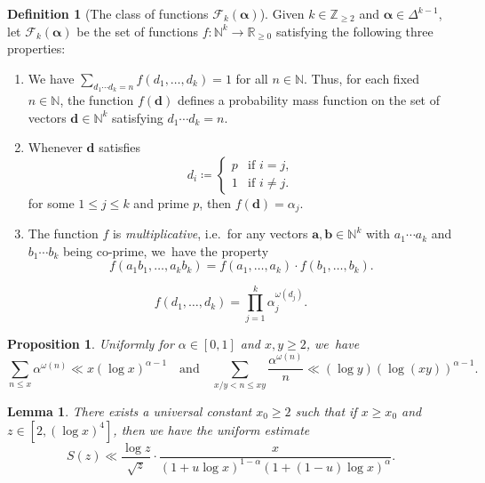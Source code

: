 \documentclass[10pt,a4paper]{article}
\providecommand{\ie}{i.e.\ }
\newenvironment{enumeratea}
{\bgroup\def\theenumi{\alph{enumi}}\begin{enumerate}}
{\end{enumerate}\egroup}
\newcommand{\ba}{{\boldsymbol a}}
\newcommand{\bb}{{\boldsymbol b}}
\newcommand{\bd}{{\boldsymbol d}}
\newcommand{\NN}{\mathbb{N}}
\newcommand{\ZZ}{\mathbb{Z}}
\newcommand{\RR}{\mathbb{R}}
\newcommand{\boldalpha}{\boldsymbol{\alpha}}
\newcommand{\simplex}{\Delta^{k-1}}
\theoremstyle{plain}
\newtheorem{lem}[cor]{Lemma}
\newtheorem{prop}[cor]{Proposition}
\theoremstyle{definition}
\newtheorem{deff}[cor]{Definition}
\begin{document}
\begin{deff}[The class of functions $\mathcal F_k(\boldalpha)$]\label{dfn:Fktheta}
Given $k\in\ZZ_{\ge2}$ and $\boldalpha\in \simplex$, let $\mathcal F_k(\boldalpha)$ be the set of functions $f \colon \NN^{k} \to \RR_{ \ge 0}$ satisfying the following three properties:
\begin{enumeratea}
\item\label{dfn:Fkthetaa} We have $\sum_{d_1\cdots d_k = n} f(d_1, \ldots, d_k) = 1$ for all $n \in \NN$. Thus, for each fixed $n \in \NN$, the function $f(\bd)$ defines a probability mass function on the set of vectors $\bd \in \NN^k$ satisfying $d_1\cdots d_k = n$.

\item\label{dfn:Fkthetab} Whenever $\bd$ satisfies
\[
d_i \coloneqq \begin{cases}
p &\text{if $i = j$}, \\
1 &\text{if $i \ne j$}.
\end{cases}
\]
for some $1 \le j \le k$ and prime $p$, then $f(\bd) = \alpha_j$.

\item\label{dfn:Fkthetac} The function $f$ is \emph{multiplicative}, \ie for any vectors $\ba, \bb \in \NN^k$ with $a_1\cdots a_k$ and $b_1 \cdots b_k$ being co-prime, we~have the property
\[
f(a_1b_1, \ldots, a_kb_k) = f(a_1, \ldots, a_k) \cdot f(b_1, \ldots, b_k).
\]
\end{enumeratea}
\end{deff}

\begin{equation}
\label{eq:f on squarefrees}
f(d_1,\dots,d_k) = \prod_{j=1}^k \alpha_j^{\omega(d_j)}.
\end{equation}

\begin{prop}
\label{prel:partial summation bounds}
Uniformly for $\alpha\in[0,1]$ and $x,y\ge2$, we~have
\[
\sum_{n \le x} \alpha^{\omega(n)} \ll x(\log x)^{\alpha-1}
\quad \text{and} \quad \sum_{x/y<n \le xy} \frac{ \alpha^{\omega(n)}}{n} \ll (\log y)(\log(xy))^{\alpha-1}.
\]
\end{prop}

\begin{lem}
There exists a universal constant $x_0\ge2$ such that if $x\ge x_0$ and $z\in[2,(\log x)^4]$, then we have the uniform estimate
\[
S(z) \ll \frac{\log z}{\sqrt{z}} \cdot \frac{x}{(1+ u\log x)^{1-\alpha}(1+(1-u)\log x)^{\alpha}}.
\]
\end{lem}
\end{document}
